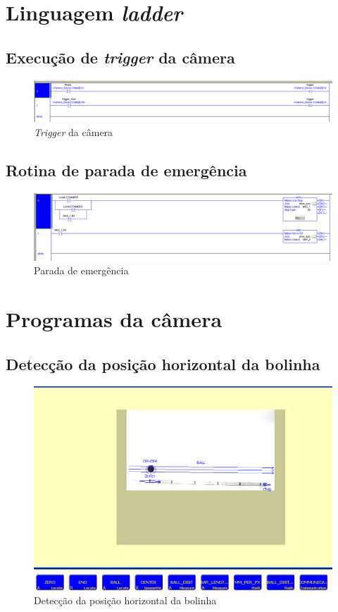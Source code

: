 \section{Linguagem \textit{ladder}}
\subsection{Execução de \textit{trigger} da câmera}
\label{laddertrigger}
\begin{figure}[!ht]
\centering
\includegraphics[width=\linewidth]{figs/ladder/camera_trigger}
\caption{\textit{Trigger} da câmera}
\end{figure}

\subsection{Rotina de parada de emergência}
\label{emergencyladder}
\begin{figure}[!ht]
\centering
\includegraphics[width=\linewidth]{figs/ladder/parada}
\caption{Parada de emergência}
\end{figure}

\section{Programas da câmera}
\subsection{Detecção da posição horizontal da bolinha}
\label{ballhorzpos}
\begin{figure}[!ht]
\centering
\includegraphics[width=\linewidth]{figs/presence/programaCaptura}
\caption{Detecção da posição horizontal da bolinha}
\end{figure}